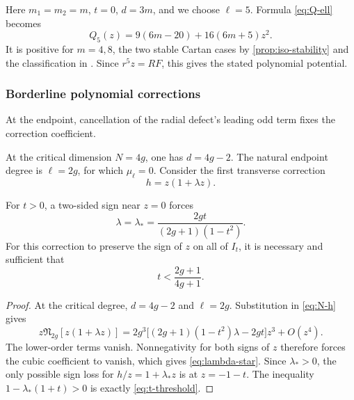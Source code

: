 Here \(m_1=m_2=m\), \(t=0\), \(d=3m\), and we choose \(\ell=5\).  Formula
\eqref{eq:Q-ell} becomes
\begin{equation}\label{eq:g3-Q}
 Q_5(z)=9(6m-20)+16(6m+5)z^2.
\end{equation}
It is positive for \(m=4,8\), the two stable Cartan cases by
\cref{prop:iso-stability} and the classification in
\cite[Section~3.1.1]{NadirashviliTkachevVladut14}.  Since
\(r^{5}z=RF\), this gives the stated polynomial potential.

\subsubsection{Borderline polynomial corrections}

At the endpoint, cancellation of the radial defect's leading odd
term fixes the correction coefficient.

At the critical dimension \(N=4g\), one has \(d=4g-2\).  The natural
endpoint degree is \(\ell=2g\), for which \(\mu_\ell=0\).  Consider the
first transverse correction
\begin{equation}\label{eq:critical-h}
 h=z(1+\lambda z).
\end{equation}

\begin{proposition}
\label{prop:forced-critical-lambda}
For \(t>0\), a two-sided sign near \(z=0\) forces
\begin{equation}\label{eq:lambda-star}
 \lambda=\lambda_*=
 \frac{2gt}{(2g+1)(1-t^2)}.
\end{equation}
For this correction to preserve the sign of \(z\) on all of \(I_t\), it is
necessary and sufficient that
\begin{equation}\label{eq:t-threshold}
 t<\frac{2g+1}{4g+1}.
\end{equation}
\end{proposition}

\begin{proof}
At the critical degree, \(d=4g-2\) and \(\ell=2g\).
Substitution in \eqref{eq:N-h} gives
\[
 z\mathfrak N_{2g}[z(1+\lambda z)]
 =2g^3\bigl[(2g+1)(1-t^2)\lambda-2gt\bigr]z^3+O(z^4).
\]
The lower-order terms vanish. Nonnegativity for both signs of \(z\)
therefore forces the cubic coefficient to vanish, which gives
\eqref{eq:lambda-star}. Since
\(\lambda_*>0\), the only possible sign loss for \(h/z=1+\lambda_*z\)
is at \(z=-1-t\).  The inequality
\(1-\lambda_*(1+t)>0\) is exactly \eqref{eq:t-threshold}.
\end{proof}

